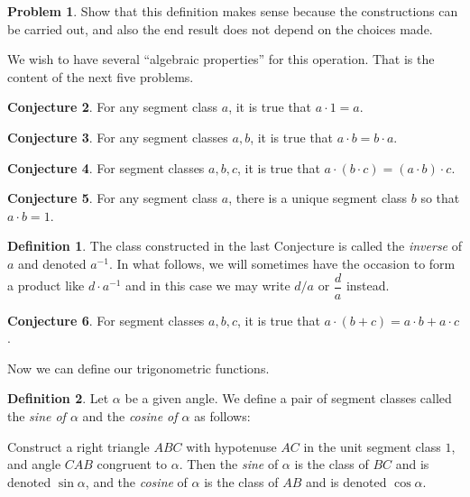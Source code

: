 \documentclass{amsart}
\theoremstyle{definition}
\newtheorem{problem}{Problem}[section]
\newtheorem{conjecture}[problem]{Conjecture}
\newtheorem*{definition}{Definition}
\begin{document}
\begin{problem}
Show that this definition makes sense because the constructions can be carried out, and also the end result does not depend on the choices made.
\end{problem}

We wish to have several ``algebraic properties'' for this operation. That is the content of the next five problems.

\begin{conjecture} \label{problem:segment-class-structure}
For any segment class $a$, it is true that $a\cdot 1 = a$.
\end{conjecture}

\begin{conjecture} 
For any segment classes $a, b$, it is true that $a\cdot b = b\cdot a$.
\end{conjecture}

\begin{conjecture} 
For segment classes $a, b, c$, it is true that $a\cdot (b\cdot c) = (a\cdot b) \cdot c$.
\end{conjecture}

\begin{conjecture} 
For any segment class $a$, there is a unique segment class $b$ so that $a\cdot b = 1$.
\end{conjecture}

\begin{definition} The class constructed in the last Conjecture is called the \emph{inverse} of $a$ and denoted $a^{-1}$. In what follows, we will sometimes have the occasion to form a product like $d \cdot a^{-1}$ and in this case we may write $d/ a$ or $\dfrac{d}{a}$ instead.
\end{definition}

\begin{conjecture} 
For segment classes $a, b, c$, it is true that $a\cdot (b + c) = a\cdot b + a\cdot c$.
\end{conjecture}

Now we can define our trigonometric functions.

\begin{definition}\label{defn:trig-fns}
Let $\alpha$ be a given angle. We define a pair of segment classes called the \emph{sine of $\alpha$} and the \emph{cosine of $\alpha$} as follows: 

Construct a right triangle $ABC$ with hypotenuse $AC$ in the unit segment class $1$, and angle $CAB$ congruent to $\alpha$. Then the \emph{sine} of $\alpha$ is the class of $BC$ and is denoted $\sin \alpha$, and the \emph{cosine} of $\alpha$ is the class of $AB$ and is denoted $\cos \alpha$.
\end{definition}
\end{document}
